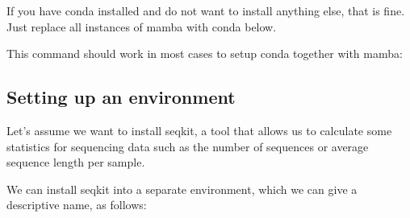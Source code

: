 \documentclass[
  letterpaper,
  DIV=11,
  numbers=noendperiod]{scrreprt}
\newenvironment{Shaded}{}{}
\newcommand{\AttributeTok}[1]{\textcolor[rgb]{0.84,0.23,0.29}{#1}}
\newcommand{\ExtensionTok}[1]{\textcolor[rgb]{0.84,0.23,0.29}{\textbf{#1}}}
\newcommand{\FunctionTok}[1]{\textcolor[rgb]{0.44,0.26,0.76}{#1}}
\newcommand{\NormalTok}[1]{\textcolor[rgb]{0.14,0.16,0.18}{#1}}
\newcommand{\StringTok}[1]{\textcolor[rgb]{0.01,0.18,0.38}{#1}}
\newcommand{\VariableTok}[1]{\textcolor[rgb]{0.89,0.38,0.04}{#1}}
\begin{document}
If you have conda installed and do not want to install anything else,
that is fine. Just replace all instances of mamba with conda below.

This command should work in most cases to setup conda together with
mamba:

\begin{Shaded}
\end{Shaded}

\subsection{Setting up an environment}\label{setting-up-an-environment}

Let's assume we want to install seqkit, a tool that allows us to
calculate some statistics for sequencing data such as the number of
sequences or average sequence length per sample.

We can install seqkit into a separate environment, which we can give a
descriptive name, as follows:
\end{document}
